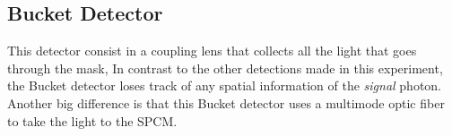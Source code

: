 \subsection{Bucket Detector}
This detector consist in a coupling lens that collects all the light that goes through the mask, 
In contrast to the other detections made in this experiment, the Bucket detector loses track of any spatial information of the \textit{signal} photon. Another big difference is that this Bucket detector uses a multimode optic fiber to take the light to the SPCM.

